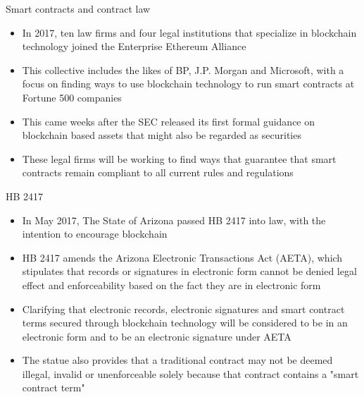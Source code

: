 \documentclass[9pt]{beamer}
\begin{document}


\begin{frame}{Smart contracts and contract law}
	\begin{itemize}
		\item In 2017, ten law firms and four legal institutions that specialize in blockchain technology joined the Enterprise Ethereum Alliance
		\item This collective includes the likes of BP, J.P. Morgan and Microsoft, with a focus on finding ways to use blockchain technology to run smart contracts at Fortune 500 companies
		\item This came weeks after the SEC released its first formal guidance on blockchain based assets that might also be regarded as securities
		\item These legal firms will be working to find ways that guarantee that smart contracts remain compliant to all current rules and regulations
	\end{itemize}
\end{frame}



\begin{frame}{HB 2417}
	\begin{itemize}
		\item In May 2017, The State of Arizona passed HB 2417 into law, with the intention to encourage blockchain
		\item HB 2417 amends the Arizona Electronic Transactions Act (AETA), which stipulates that records or signatures in electronic form cannot be denied legal effect and enforceability based on the fact they are in electronic form
		\item Clarifying that electronic records, electronic signatures and smart contract terms secured through blockchain technology will be considered to be in an electronic form and to be an electronic signature under AETA
		\item The statue also provides that a traditional contract may not be deemed illegal, invalid or unenforceable solely because that contract contains a "smart contract term"
	\end{itemize}
\end{frame}
\end{document}
